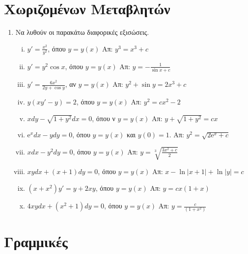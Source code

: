



\pagestyle{askhseis}




\begin{center}
  \minibox{\large \bfseries \textcolor{Col1}{Διαφορικές Εξισώσεις}}
\end{center}

\vspace{\baselineskip}

\section*{Χωριζομένων Μεταβλητών}


\begin{enumerate}
  \item Να λυθούν οι παρακάτω διαφορικές εξισώσεις.
    \begin{enumerate}[i)]
      \item $ y' =\frac{x^2}{y^2}$, όπου $ y=y(x) $ 
        \hfill Απ: $y^3=x^3+c$
      \item $y'=y^2\cos x$, όπου $ y=y(x) $ \hfill Απ: $y=-\frac{1}{\sin x +c }$
      \item $ y' =\frac{6x^2}{2y+\cos y}$, αν $ y=y(x) $ 
        \hfill Απ: $y^2+\sin y = 2x^3 +c$
      \item $ y(xy'-y)=2 $, όπου $ y=y(x) $ 
        \hfill Απ: $ y^2=cx^2-2 $   
      \item $ xdy- \sqrt{1+y^2} dx=0 $, όπου ν $ y=y(x) $ 
        \hfill Απ: $ y+ \sqrt{1+y^2} = cx $  
      \item $ \mathrm{e}^{x} dx - ydy = 0 $, όπου $ y=y(x) $ 
        και $ y(0)=1 $. \hfill Απ: $ y^{2} = \sqrt{2 \mathrm{e}^{x} + c}$
      \item $ xdx-y^{2}dy=0  $, όπου $ y=y(x) $ 
        \hfill Απ: $ y= \sqrt[3]{\frac{3x^{2}+c}{2}}  $
      \item $xydx + (x+1)dy=0$, όπου $ y=y(x) $ \hfill Απ: $x-\ln|x+1|+\ln|y|=c$
      \item $(x+x^2)y'=y+2xy$, όπου $ y=y(x) $ \hfill Απ: $y=cx(1+x)$
      \item $4xydx+(x^2+1)dy=0$, όπου $ y=y(x) $ \hfill Απ: $y=\frac{c}{(1+x^2)}$
    \end{enumerate}
\end{enumerate}


\section*{Γραμμικές}

